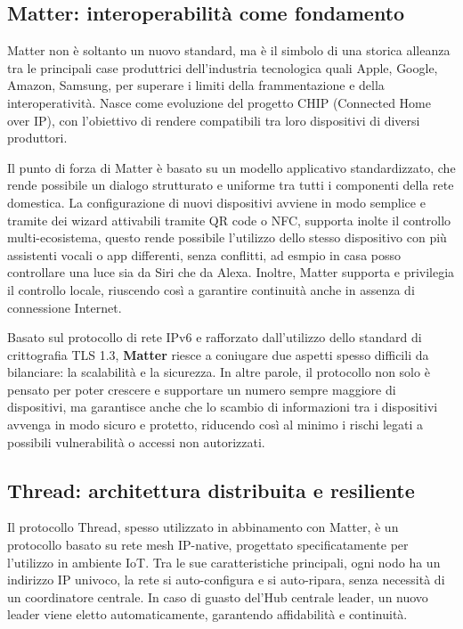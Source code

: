 \subsection{Matter: interoperabilità come fondamento}

Matter non è soltanto un nuovo standard, ma è il simbolo di una storica alleanza tra le principali case produttrici dell’industria tecnologica quali Apple, Google, Amazon, Samsung, per superare i limiti della frammentazione e della interoperatività. Nasce come evoluzione del progetto CHIP (Connected Home over IP), con l'obiettivo di rendere compatibili tra loro dispositivi di diversi produttori.

Il punto di forza di Matter è basato su un modello applicativo standardizzato, che rende possibile un dialogo strutturato e uniforme tra tutti i componenti della rete domestica. La configurazione di nuovi dispositivi avviene in modo semplice e tramite dei wizard attivabili tramite QR code o NFC, supporta inolte il controllo multi-ecosistema, questo rende possibile l’utilizzo dello stesso dispositivo con più assistenti vocali o app differenti, senza conflitti, ad esmpio in casa posso controllare una luce sia da Siri che da Alexa. Inoltre, Matter supporta e privilegia il controllo locale, riuscendo così a garantire continuità anche in assenza di connessione Internet.

Basato sul protocollo di rete IPv6 e rafforzato dall’utilizzo dello standard di crittografia TLS 1.3, \textbf{Matter} riesce a coniugare due aspetti spesso difficili da bilanciare: la scalabilità e la sicurezza. In altre parole, il protocollo non solo è pensato per poter crescere e supportare un numero sempre maggiore di dispositivi, ma garantisce anche che lo scambio di informazioni tra i dispositivi avvenga in modo sicuro e protetto, riducendo così al minimo i rischi legati a possibili vulnerabilità o accessi non autorizzati.


\subsection{Thread: architettura distribuita e resiliente}

Il protocollo Thread, spesso utilizzato in abbinamento con Matter, è un protocollo basato su rete mesh IP-native, progettato specificatamente per l'utilizzo in ambiente IoT. Tra le sue caratteristiche principali, ogni nodo ha un indirizzo IP univoco, la rete si auto-configura e si auto-ripara, senza necessità di un coordinatore centrale. In caso di guasto del'Hub centrale leader, un nuovo leader viene eletto automaticamente, garantendo affidabilità e continuità.

